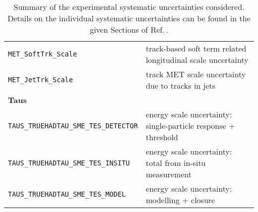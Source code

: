 \begin{table}
{\begin{tabular}{ll}
      \texttt{MET\_SoftTrk\_Scale} & track-based soft term related longitudinal scale uncertainty \\%
      \texttt{MET\_JetTrk\_Scale} & track MET scale uncertainty due to tracks in jets \\%
      {\bfseries Taus}&\\
      \texttt{TAUS\_TRUEHADTAU\_SME\_TES\_DETECTOR} & energy scale uncertainty: single-particle response + threshold \\%
      \texttt{TAUS\_TRUEHADTAU\_SME\_TES\_INSITU} & energy scale uncertainty: total from in-situ measurement \\%
      \texttt{TAUS\_TRUEHADTAU\_SME\_TES\_MODEL} & energy scale uncertainty: modelling + closure \\%
      \bottomrule
    \end{tabular}
  }
  \caption{Summary of the experimental systematic uncertainties considered.
    Details on the individual systematic uncertainties can be found in the given
    Sections of Ref.\,\cite{VHobjectsupportnote}.}
  \label{tab:expSyst}
\end{table}